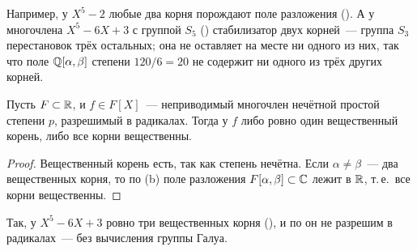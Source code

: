 Например, у $X^5-2$ любые два корня порождают поле разложения (). А у многочлена $X^5-6X+3$ с группой $S_5$
() стабилизатор двух корней~--- группа $S_3$ перестановок трёх остальных; она не оставляет на месте ни одного из
них, так что поле $\mathbb Q[\alpha,\beta]$ степени $120/6=20$ не содержит ни одного из трёх других корней.

\begin{corollary}[3.30c: Кронекер]
Пусть $F\subset\mathbb R$, и $f\in F[X]$~--- неприводимый многочлен нечётной простой степени $p$, разрешимый в радикалах. Тогда у
$f$ либо ровно один вещественный корень, либо все корни вещественны.
\end{corollary}

\begin{proof}
Вещественный корень есть, так как степень нечётна. Если $\alpha\ne\beta$~--- два вещественных корня, то по (b) поле
разложения $F[\alpha,\beta]\subset\mathbb C$ лежит в $\mathbb R$, т.\,е.\ все корни вещественны.
\end{proof}

Так, у $X^5-6X+3$ ровно три вещественных корня (), и по  он не разрешим в радикалах~--- без вычисления
группы Галуа.

